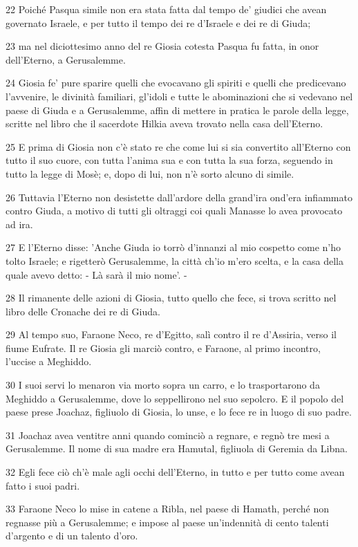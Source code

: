 \par 22 Poiché Pasqua simile non era stata fatta dal tempo de' giudici che avean governato Israele, e per tutto il tempo dei re d'Israele e dei re di Giuda;
\par 23 ma nel diciottesimo anno del re Giosia cotesta Pasqua fu fatta, in onor dell'Eterno, a Gerusalemme.
\par 24 Giosia fe' pure sparire quelli che evocavano gli spiriti e quelli che predicevano l'avvenire, le divinità familiari, gl'idoli e tutte le abominazioni che si vedevano nel paese di Giuda e a Gerusalemme, affin di mettere in pratica le parole della legge, scritte nel libro che il sacerdote Hilkia aveva trovato nella casa dell'Eterno.
\par 25 E prima di Giosia non c'è stato re che come lui si sia convertito all'Eterno con tutto il suo cuore, con tutta l'anima sua e con tutta la sua forza, seguendo in tutto la legge di Mosè; e, dopo di lui, non n'è sorto alcuno di simile.
\par 26 Tuttavia l'Eterno non desistette dall'ardore della grand'ira ond'era infiammato contro Giuda, a motivo di tutti gli oltraggi coi quali Manasse lo avea provocato ad ira.
\par 27 E l'Eterno disse: 'Anche Giuda io torrò d'innanzi al mio cospetto come n'ho tolto Israele; e rigetterò Gerusalemme, la città ch'io m'ero scelta, e la casa della quale avevo detto: - Là sarà il mio nome'. -
\par 28 Il rimanente delle azioni di Giosia, tutto quello che fece, si trova scritto nel libro delle Cronache dei re di Giuda.
\par 29 Al tempo suo, Faraone Neco, re d'Egitto, salì contro il re d'Assiria, verso il fiume Eufrate. Il re Giosia gli marciò contro, e Faraone, al primo incontro, l'uccise a Meghiddo.
\par 30 I suoi servi lo menaron via morto sopra un carro, e lo trasportarono da Meghiddo a Gerusalemme, dove lo seppellirono nel suo sepolcro. E il popolo del paese prese Joachaz, figliuolo di Giosia, lo unse, e lo fece re in luogo di suo padre.
\par 31 Joachaz avea ventitre anni quando cominciò a regnare, e regnò tre mesi a Gerusalemme. Il nome di sua madre era Hamutal, figliuola di Geremia da Libna.
\par 32 Egli fece ciò ch'è male agli occhi dell'Eterno, in tutto e per tutto come avean fatto i suoi padri.
\par 33 Faraone Neco lo mise in catene a Ribla, nel paese di Hamath, perché non regnasse più a Gerusalemme; e impose al paese un'indennità di cento talenti d'argento e di un talento d'oro.
